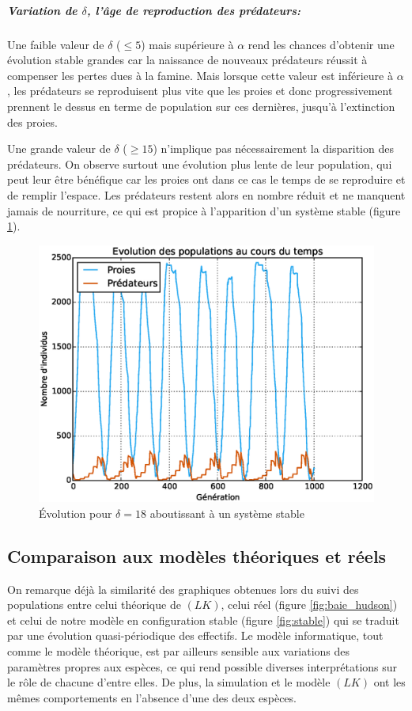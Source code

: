\documentclass[11pt]{article}
\begin{document}
\subparagraph{Variation de $\delta$, l'âge de reproduction des prédateurs:} 

Une faible valeur de $\delta$ ($ \leq 5 $) mais supérieure à $\alpha$ rend les chances d'obtenir une évolution stable grandes car la naissance de nouveaux prédateurs réussit à compenser les pertes dues à la famine. Mais lorsque cette valeur est inférieure à $\alpha$, les prédateurs se reproduisent plus vite que les proies et donc progressivement prennent le dessus en terme de population sur ces dernières, jusqu'à l'extinction des proies.

Une grande valeur de $\delta$ ($ \geq 15 $) n'implique pas nécessairement la disparition des prédateurs. On observe surtout une évolution plus lente de leur population, qui peut leur être bénéfique car les proies ont dans ce cas le temps de se reproduire et de remplir l'espace. Les prédateurs restent alors en nombre réduit et ne manquent  jamais de nourriture, ce qui est propice à l'apparition d'un système stable (figure \ref{fig:taux_predat_eleve}).

\begin{figure}[!ht]
    \centering
    \includegraphics[width=12cm]{taux_predat_grand.eps}
    \caption{Évolution pour $\delta = 18$ aboutissant à un système stable}
    \label{fig:taux_predat_eleve}
\end{figure}


\subsection{Comparaison aux modèles théoriques et réels}

On remarque déjà la similarité des graphiques obtenues lors du suivi des populations entre celui théorique de $(LK)$, celui réel (figure \ref{fig:baie_hudson}) et celui de notre modèle en configuration stable (figure \ref{fig:stable}) qui se traduit par une évolution quasi-périodique des effectifs. Le modèle informatique, tout comme le modèle théorique, est par ailleurs sensible aux variations des paramètres propres aux espèces, ce qui rend possible diverses interprétations sur le rôle de chacune d'entre elles. De plus, la simulation et le modèle $(LK)$ ont les mêmes comportements en l'absence d'une des deux espèces.
\end{document}
